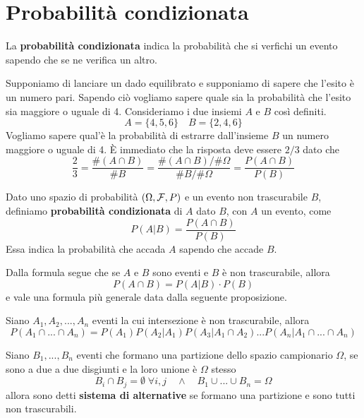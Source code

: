 \section{Probabilità condizionata}
La \textbf{probabilità condizionata} indica la probabilità che si verfichi un evento sapendo che
se ne verifica un altro.

\begin{example}
	Supponiamo di lanciare un dado equilibrato e supponiamo di sapere che l'esito è un numero
	pari. Sapendo ciò vogliamo sapere quale sia la probabilità che l'esito sia maggiore o uguale
	di 4. Consideriamo i due insiemi $A$ e $B$ così definiti. 
	\[ A = \{ 4, 5, 6 \} \quad B = \{ 2, 4, 6 \} \]
	Vogliamo sapere qual'è la probabilità di estrarre dall'insieme $B$ un numero maggiore o uguale
	di 4. \`E immediato che la risposta deve essere $2/3$ dato che 
	\[
		\frac{2}{3} = \frac{\# (A \cap B)}{\# B} =
		\frac{\# (A \cap B) / \# \Omega}{\# B / \# \Omega} =
		\frac{P(A \cap B)}{P(B)}
	\]
\end{example}

\begin{definition}
	Dato uno spazio di probabilità $(\Omega, \mathcal{F}, P)$ e un evento non trascurabile $B$, definiamo 
	\textbf{probabilità condizionata} di $A$ dato $B$, con $A$ un evento, come 
	\[ P(A | B) = \frac{P(A \cap B)}{P(B)} \]
	Essa indica la probabilità che accada $A$ sapendo che accade $B$.
\end{definition}

Dalla formula segue che se $A$ e $B$ sono eventi e $B$ è non trascurabile, allora 
\[ P(A \cap B) = P(A | B) \cdot P(B) \]
e vale una formula più generale data dalla seguente proposizione.

\begin{proposition}
	Siano $A_1, A_2, ..., A_n$ eventi la cui intersezione è non trascurabile, allora
	\[
		P(A_1 \cap  ... \cap A_n) = P(A_1) P(A_2 | A_1) P(A_3 | A_1 \cap A_2)
		... P(A_n | A_1 \cap ... \cap A_n)
	\]
\end{proposition}

\begin{definition}
	Siano $B_1, ..., B_n$ eventi che formano una partizione dello spazio campionario $\Omega$, se
	sono a due a due disgiunti e la loro unione è $\Omega$ stesso
	\[ B_i \cap B_j = \emptyset \; \forall i,j \quad \land \quad B_1 \cup ... \cup B_n = \Omega \]
	allora sono detti \textbf{sistema di alternative} se formano una partizione e sono tutti non
	trascurabili.
\end{definition}

